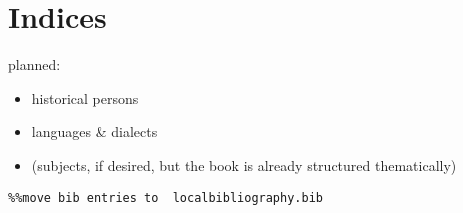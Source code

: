 \documentclass[output=paper]{langsci/langscibook}
\begin{document}
\section{Indices}
\hypertarget{Toc19704873}{}
planned:

\begin{itemize}
\item \begin{styleListParagraph}
historical persons
\end{styleListParagraph}
\item \begin{styleListParagraph}
languages \& dialects
\end{styleListParagraph}
\item \begin{styleListParagraph}
(subjects, if desired, but the book is already structured thematically)
\end{styleListParagraph}
\end{itemize}

\begin{verbatim}%%move bib entries to  localbibliography.bib
\end{verbatim}
\sloppy\printbibliography[heading=subbibliography,notkeyword=this]
\end{document}
